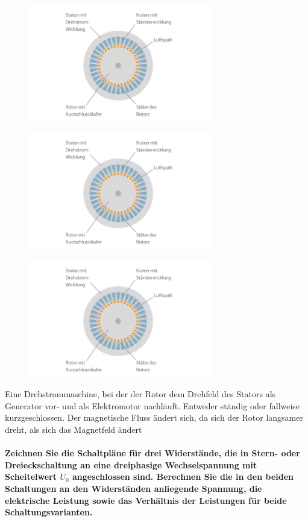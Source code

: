 \documentclass[a4paper, 11pt, parskip=half]{scrartcl}
\begin{document}
\begin{figure}[H]
    \centering
    \includegraphics[width=8cm]{image/9/asynchronm}
\end{figure}
\begin{figure}[H]
    \centering
    \includegraphics[width=8cm]{image/9/asynchronm}
\end{figure}
\begin{figure}[H]
    \centering
    \includegraphics[width=8cm]{image/9/asynchronm}
\end{figure}

Eine Drehstrommaschine, bei der der Rotor dem Drehfeld des Stators  als Generator vor- und als Elektromotor nachläuft. Entweder ständig oder fallweise kurzgeschlossen.  Der magnetische Fluss ändert sich, da sich der Rotor langsamer dreht, als sich das Magnetfeld ändert

\paragraph{Zeichnen Sie die Schaltpläne für drei Widerstände, die in Stern- oder Dreieckschaltung an
eine dreiphasige Wechselspannung mit Scheitelwert $U_0$ angeschlossen sind. Berechnen Sie die in den
beiden Schaltungen an den Widerständen anliegende Spannung, die elektrische Leistung sowie das
Verhältnis der Leistungen für beide Schaltungsvarianten.}
\end{document}

